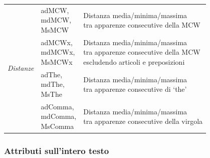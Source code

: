 \documentclass[titlepage]{article}
\begin{document}
\begin{center}
\begin{tabular}{cll}
    \midrule
    \multirow{4}{*}{\textit{Distanze}} & \makecell[l]{adMCW,\\mdMCW,\\MsMCW} & \makecell[l]{Distanza media/minima/massima \\ tra apparenze consecutive della MCW} \\
    & \makecell[l]{adMCWx,\\mdMCWx,\\MsMCWx} & \makecell[l]{Distanza media/minima/massima \\ tra apparenze consecutive della MCW \\ escludendo articoli e preposizioni} \\
    & \makecell[l]{adThe,\\mdThe,\\MsThe} & \makecell[l]{Distanza media/minima/massima \\ tra apparenze consecutive di `the'}  \\
    & \makecell[l]{adComma,\\mdComma,\\MsComma} & \makecell[l]{Distanza media/minima/massima \\ tra apparenze consecutive della virgola} \\
    
    \bottomrule
\end{tabular}
\end{center}

\newpage
\subsubsection{Attributi sull'intero testo}
\end{document}

